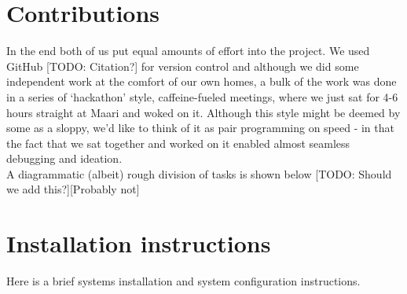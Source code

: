 
\section{Contributions}
In the end both of us put equal amounts of effort into the project. 
We used GitHub [TODO: Citation?] for version control and although we did
some independent work at the comfort of our own homes, a bulk of the work
was done in a series of \lq hackathon' style, caffeine-fueled meetings, where we just sat
for 4-6 hours straight at Maari and woked on it. Although this style might be deemed by some
as a sloppy, we'd like to think of it as pair programming on speed - in that 
the fact that we sat together and worked on it enabled almost seamless debugging
and ideation.\\

A diagrammatic (albeit) rough division of tasks is shown below [TODO: Should we add this?][Probably not]






\nocite{*}





\appendix
\section{Installation instructions} \label{App:instructions}


Here is a brief systems installation and system configuration instructions. 

